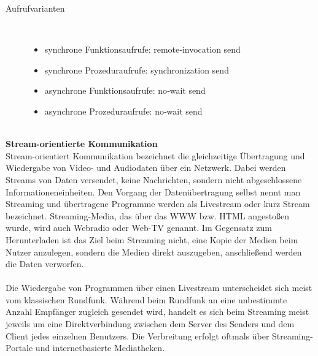 \documentclass[a4paper,12pt]{article}
\begin{document}
\newpage
\noindent
\begin{description}
    \item[Aufrufvarianten] ~\par
    \begin{itemize}
        \item synchrone Funktionsaufrufe: remote‑invocation send
        \item synchrone Prozeduraufrufe: synchronization send
        \item asynchrone Funktionsaufrufe: no‑wait send
        \item asynchrone Prozeduraufrufe: no‑wait send\\\\
    \end{itemize} 
\end{description}
\textbf{Stream-orientierte Kommunikation}\\
Stream-orientiert Kommunikation bezeichnet die gleichzeitige Übertragung und Wiedergabe von Video- und Audiodaten über ein Netzwerk.
Dabei werden Streams von Daten versendet, keine Nachrichten, sondern nicht abgeschlossene Informationeneinheiten.
Den Vorgang der Datenübertragung selbst nennt man Streaming und übertragene Programme werden als Livestream oder kurz Stream bezeichnet. Streaming-Media, das über das WWW bzw. HTML angestoßen wurde, wird auch Webradio oder Web-TV genannt. Im Gegensatz zum Herunterladen ist das Ziel beim Streaming nicht, eine Kopie der Medien beim Nutzer anzulegen, sondern die Medien direkt auszugeben, anschließend werden die Daten verworfen.
\\\\
Die Wiedergabe von Programmen über einen Livestream unterscheidet sich meist vom klassischen Rundfunk. Während beim Rundfunk an eine unbestimmte Anzahl Empfänger zugleich gesendet wird, handelt es sich beim Streaming meist jeweils um eine Direktverbindung zwischen dem Server des Senders und dem Client jedes einzelnen Benutzers. Die Verbreitung erfolgt oftmals über Streaming-Portale und internetbasierte Mediatheken.
\cite{communication2}
\newpage
\noindent
\end{document}
